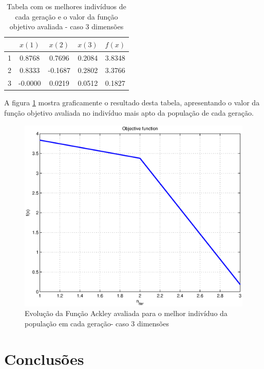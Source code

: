 \documentclass[conference,compsoc]{IEEEtran}
\begin{document}
\begin{table}[!htcb]
  \centering
  \begin{tabular}{|c|c|c|c|c|}
    \hline
    \rowcolor{kugray5}
    &    $x(1)$   &    $x(2)$   &    $x(3)$    &   $f(x)$  \\ \hline
	\cellcolor{kugray5}1   &   0.8768   &     0.7696	&    0.2084    &   3.8348  \\ \hline	
    \rowcolor{kugray5}
		2   &   0.8333   &    -0.1687	&    0.2802    &   3.3766  \\ \hline
	\cellcolor{kugray5}3   &   -0.0000   &    0.0219	&    0.0512    &   0.1827  \\ \hline
	\end{tabular}
  \caption{Tabela com os melhores indivíduos de cada geração e o valor da função objetivo avaliada - caso 3 dimensões}
  \label{fig:table3dim}
\end{table}

A figura \ref{fig:ES_ackley_3dim} mostra graficamente o resultado desta tabela, apresentando o valor da função objetivo avaliada no indivíduo mais apto da população de cada geração.

\begin{figure}[!htcb]
\centering
\includegraphics[scale=0.45]{ES_ackley_3dim.eps}
\caption{Evolução da Função Ackley avaliada para o melhor indivíduo da população em cada geração- caso 3 dimensões}
\label{fig:ES_ackley_3dim}
\end{figure}

\section{Conclusões}
\end{document}
